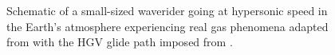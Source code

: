 





\begin{figure}[hbt!]
    \centering
    \fontsize{9}{10}\selectfont
    \caption{Schematic of a small-sized waverider going at hypersonic speed in the Earth’s atmosphere experiencing real gas phenomena adapted from \citep{Anderson2019} with the HGV glide path imposed from \citep{Rizvi2015}.}
    \label{figure:trajectory}
\end{figure}


